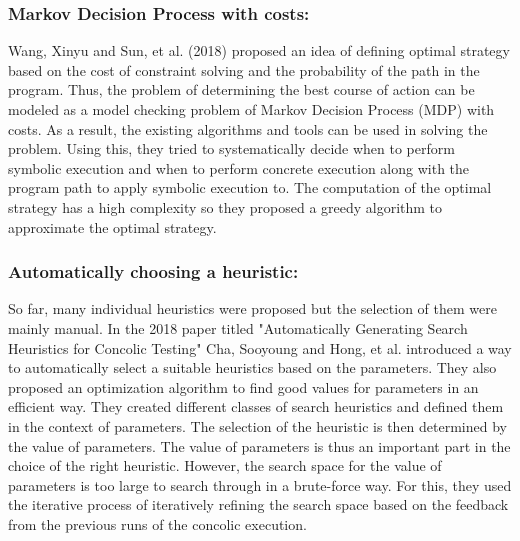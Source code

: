 \documentclass[ runningheads,
               a4paper]{llncs}
\begin{document}
\subsubsection{Markov Decision Process with costs:}
Wang, Xinyu and Sun, et al. (2018) proposed an idea \cite{wang2018towards}  of defining optimal strategy based on the cost of constraint solving and the probability of the path in the program. Thus, the problem of determining the best course of action can be modeled as a model checking problem of Markov Decision Process (MDP) with costs. As a result, the existing algorithms and tools can be used in solving the problem. Using this, they tried to  systematically decide when to perform symbolic execution and when to perform concrete execution along with the program path to apply symbolic execution to.
The computation of the optimal strategy has a high complexity so they proposed a greedy algorithm to approximate the optimal strategy.


\subsubsection{Automatically choosing a heuristic:}
So far, many individual heuristics were proposed but the selection of them were mainly manual. In the 2018 paper titled "Automatically Generating Search Heuristics for Concolic Testing" \cite{cha2018automatically} Cha, Sooyoung and Hong, et al. introduced a way to automatically select a suitable heuristics based on the parameters. They also proposed an optimization algorithm to find good values for parameters in an efficient way. They created different classes of search heuristics and defined them in the context of parameters. The selection of the heuristic is then determined by the value of parameters. The value of parameters is thus an important part in the choice of the right heuristic. However, the search space for the value of parameters is too large to search through in a brute-force way. For this, they used the iterative process of iteratively refining the search space based on the feedback from the previous runs of the concolic execution.
\end{document}
